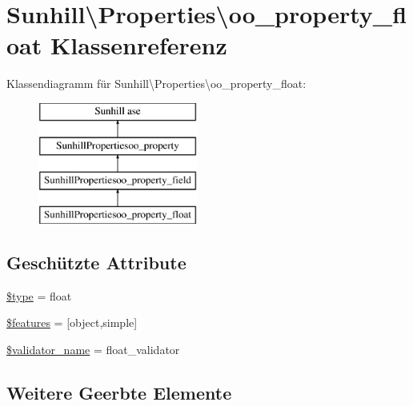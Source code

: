 \hypertarget{classSunhill_1_1Properties_1_1oo__property__float}{}\section{Sunhill\textbackslash{}Properties\textbackslash{}oo\+\_\+property\+\_\+float Klassenreferenz}
\label{classSunhill_1_1Properties_1_1oo__property__float}
Klassendiagramm für Sunhill\textbackslash{}Properties\textbackslash{}oo\+\_\+property\+\_\+float\+:\begin{figure}[H]
\begin{center}
\leavevmode
\includegraphics[height=4.000000cm]{d7/dc9/classSunhill_1_1Properties_1_1oo__property__float}
\end{center}
\end{figure}
\subsection*{Geschützte Attribute}
\begin{DoxyCompactItemize}
\item 
\hyperlink{classSunhill_1_1Properties_1_1oo__property__float_ab21d375d6ee03556af76f74cb0c286c3}{\$type} = \textquotesingle{}float\textquotesingle{}
\item 
\hyperlink{classSunhill_1_1Properties_1_1oo__property__float_a3fd42f5127ca2bf47802a0c73df654d5}{\$features} = \mbox{[}\textquotesingle{}object\textquotesingle{},\textquotesingle{}simple\textquotesingle{}\mbox{]}
\item 
\hyperlink{classSunhill_1_1Properties_1_1oo__property__float_a7c90e39c5ccde66d969dcb9606179429}{\$validator\+\_\+name} = \textquotesingle{}float\+\_\+validator\textquotesingle{}
\end{DoxyCompactItemize}
\subsection*{Weitere Geerbte Elemente}


